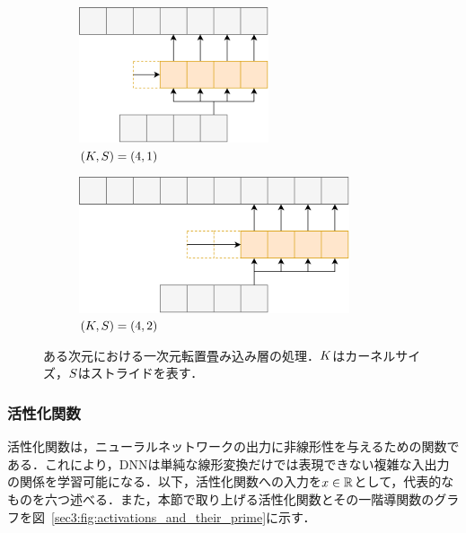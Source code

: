 \begin{figure}[tb]
    \centering
    \begin{subfigure}[b]{0.48\textwidth}
        \centering
        \includegraphics[height=4cm]{./figure/sec3/tconv1.drawio.png}
        \caption{$\left(K, S\right) = \left(4, 1\right)$}
        \label{sec3:fig:tconv1}
    \end{subfigure}
    \begin{subfigure}[b]{0.48\textwidth}
        \centering
        \includegraphics[height=4cm]{./figure/sec3/tconv2.drawio.png}
        \caption{$\left(K, S\right) = \left(4, 2\right)$}
        \label{sec3:fig:tconv2}
    \end{subfigure}
    \caption{ある次元における一次元転置畳み込み層の処理．$K$はカーネルサイズ，$S$はストライドを表す．}
    \label{sec3:fig:tconv_variations}
\end{figure}

\subsubsection{活性化関数}
活性化関数は，ニューラルネットワークの出力に非線形性を与えるための関数である．これにより，DNNは単純な線形変換だけでは表現できない複雑な入出力の関係を学習可能になる．以下，活性化関数への入力を$x \in \mathbb{R}$として，代表的なものを六つ述べる．また，本節で取り上げる活性化関数とその一階導関数のグラフを図~\ref{sec3:fig:activations_and_their_prime}に示す．

